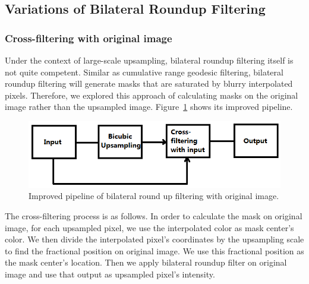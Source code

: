 \subsection{Variations of Bilateral Roundup Filtering}

\subsubsection{Cross-filtering with original image}\label{Cross-filtering with original image}
Under the context of large-scale upsampling, bilateral roundup filtering itself is not quite competent. Similar as cumulative range geodesic filtering, bilateral roundup filtering will generate masks that are saturated by blurry interpolated pixels. Therefore, we explored this approach of calculating masks on the original image rather than the upsampled image. Figure~\ref{fig:BrndupCrossFiltering} shows its improved pipeline.

\begin{figure}[htbp]\centering
\includegraphics[width=1.0\textwidth]{f7}
\caption{Improved pipeline of bilateral round up filtering with original image.}
\label {fig:BrndupCrossFiltering}
\end{figure}

The cross-filtering process is as follows. In order to calculate the mask on original image, for each upsampled pixel, we use the interpolated color as mask center's color. We then divide the interpolated pixel's coordinates by the upsampling scale to find the fractional position on original image. We use this fractional position as the mask center's location. Then we apply bilateral roundup filter on original image and use that output as upsampled pixel's intensity.

